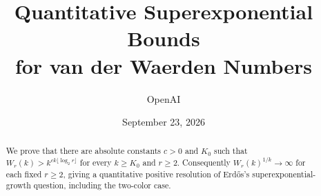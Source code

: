 \documentclass[11pt]{article}
\title{Quantitative Superexponential Bounds\\for van der Waerden Numbers}
\author{OpenAI}
\date{September 23, 2026}
\begin{document}
\maketitle
\begin{abstract}
We prove that there are absolute constants $c>0$ and $K_0$ such that
$W_r(k)>k^{ck\lfloor\log_2 r\rfloor}$ for every $k\ge K_0$ and $r\ge2$.
Consequently $W_r(k)^{1/k}\to\infty$ for each fixed $r\ge2$, giving a
quantitative positive resolution of Erd\H{o}s's superexponential-growth
question, including the two-color case.
\end{abstract}







\appendix

\clearpage


\end{document}
